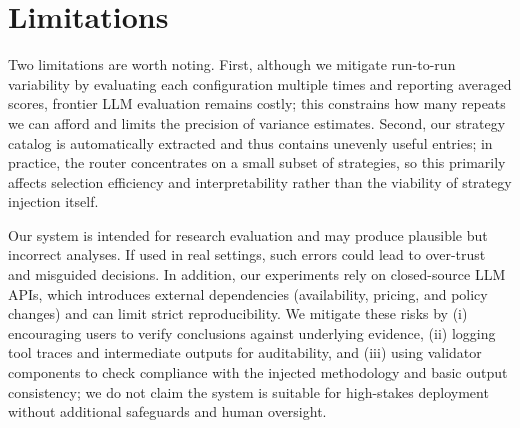 \section*{Limitations}
\label{sec:limitations}

Two limitations are worth noting. First, although we mitigate run-to-run variability by evaluating each configuration multiple times and reporting averaged scores, frontier LLM evaluation remains costly; this constrains how many repeats we can afford and limits the precision of variance estimates. Second, our strategy catalog is automatically extracted and thus contains unevenly useful entries; in practice, the router concentrates on a small subset of strategies, so this primarily affects selection efficiency and interpretability rather than the viability of strategy injection itself.

Our system is intended for research evaluation and may produce plausible but incorrect analyses. If used in real settings, such errors could lead to over-trust and misguided decisions. In addition, our experiments rely on closed-source LLM APIs, which introduces external dependencies (availability, pricing, and policy changes) and can limit strict reproducibility. We mitigate these risks by (i) encouraging users to verify conclusions against underlying evidence, (ii) logging tool traces and intermediate outputs for auditability, and (iii) using validator components to check compliance with the injected methodology and basic output consistency; we do not claim the system is suitable for high-stakes deployment without additional safeguards and human oversight.
